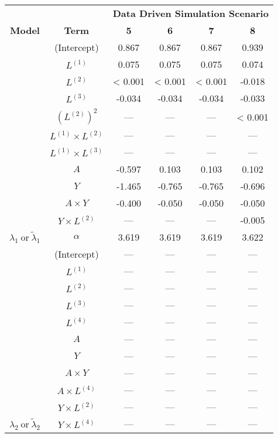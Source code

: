 \begin{table}
\begin{minipage}[t]{0.5\textwidth}
\begin{tabular}[t]{|>{}c|c|c|c|c|>{}c|}
\hline
\multicolumn{1}{|c|}{\textbf{ }} & \multicolumn{1}{|c|}{\textbf{ }} & \multicolumn{4}{|c|}{\textbf{Data Driven Simulation Scenario}} \\
\cline{3-6}
\textbf{Model} & \textbf{Term} & \textbf{5} & \textbf{6} & \textbf{7} & \textbf{8}\\
\hline
 & (Intercept) & 0.867 & 0.867 & 0.867 & 0.939\\
\cline{2-6}
 & $L^{(1)}$ & 0.075 & 0.075 & 0.075 & 0.074\\
\cline{2-6}
 & $L^{(2)}$ & < 0.001 & < 0.001 & < 0.001 & -0.018\\
\cline{2-6}
 & $L^{(3)}$ & -0.034 & -0.034 & -0.034 & -0.033\\
\cline{2-6}
 & $(L^{(2)})^2$ & --- & --- & --- & < 0.001\\
\cline{2-6}
 & $L^{(1)} \times L^{(2)}$ & --- & --- & --- & ---\\
\cline{2-6}
 & $L^{(1)} \times L^{(3)}$ & --- & --- & --- & ---\\
\cline{2-6}
 & $A$ & -0.597 & 0.103 & 0.103 & 0.102\\
\cline{2-6}
 & $Y$ & -1.465 & -0.765 & -0.765 & -0.696\\
\cline{2-6}
 & $A\times Y$ & -0.400 & -0.050 & -0.050 & -0.050\\
\cline{2-6}
 & $Y \times L^{(2)}$ & --- & --- & --- & -0.005\\
\cline{2-6}
\multirow{-12}{*}{\centering\arraybackslash $\lambda_1~\text{or}~\tilde\lambda_1$} & $\alpha$ & 3.619 & 3.619 & 3.619 & 3.622\\
\cline{1-6}
 & (Intercept) & --- & --- & --- & ---\\
\cline{2-6}
 & $L^{(1)}$ & --- & --- & --- & ---\\
\cline{2-6}
 & $L^{(2)}$ & --- & --- & --- & ---\\
\cline{2-6}
 & $L^{(3)}$ & --- & --- & --- & ---\\
\cline{2-6}
 & $L^{(4)}$ & --- & --- & --- & ---\\
\cline{2-6}
 & $A$ & --- & --- & --- & ---\\
\cline{2-6}
 & $Y$ & --- & --- & --- & ---\\
\cline{2-6}
 & $A\times Y$ & --- & --- & --- & ---\\
\cline{2-6}
 & $A \times L^{(4)}$ & --- & --- & --- & ---\\
\cline{2-6}
 & $Y \times L^{(2)}$ & --- & --- & --- & ---\\
\cline{2-6}
\multirow{-11}{*}{\centering\arraybackslash $\lambda_2~\text{or}~\tilde\lambda_2$} & $Y \times L^{(4)}$ & --- & --- & --- & ---\\
\hline
\end{tabular}
\end{minipage}
\end{table}



